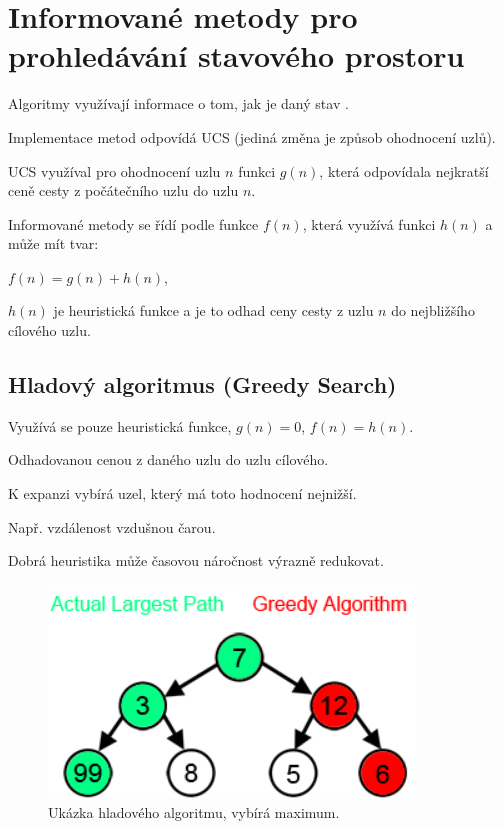 \section{Informované metody pro prohledávání stavového prostoru}

\begin{compactitem}
    \item Algoritmy využívají informace o tom, jak je daný stav .
    \item Implementace metod odpovídá UCS (jediná změna je způsob ohodnocení uzlů).
    \item UCS využíval pro ohodnocení uzlu $n$ funkci $g(n)$, která odpovídala nejkratší ceně cesty z počátečního uzlu do uzlu $n$.
    \item Informované metody se řídí podle funkce $f(n)$, která využívá funkci $h(n)$ a může mít tvar: \begin{compactitem}
        \item $f(n) = g(n) + h(n)$,
        \item $h(n)$ je heuristická funkce a je to odhad ceny cesty z uzlu $n$ do nejbližšího cílového uzlu.
    \end{compactitem}
\end{compactitem}

\subsection{Hladový algoritmus (Greedy Search)}

\begin{compactitem}
    \item {}

    \item Využívá se pouze heuristická funkce, $g(n) = 0$, $f(n) = h(n)$. \begin{compactitem}
        \item Odhadovanou cenou z daného uzlu do uzlu cílového.
        \item K expanzi vybírá uzel, který má toto hodnocení nejnižší.
        \item Např. vzdálenost vzdušnou čarou.
    \end{compactitem}

    \item Dobrá heuristika může časovou náročnost výrazně redukovat.

    \begin{figure}[H]
        \centering
        \includegraphics[width=0.5\linewidth]{greedy_search.png}
        \caption{Ukázka hladového algoritmu, vybírá maximum.}
    \end{figure}
\end{compactitem}


